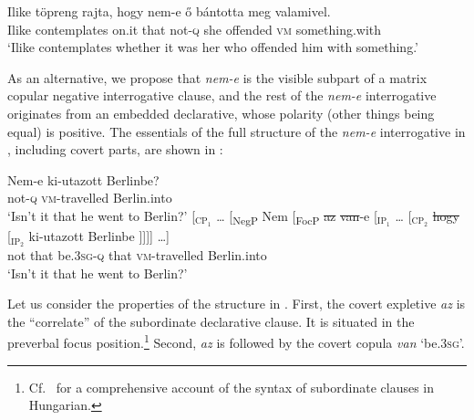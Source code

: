 \documentclass[output=paper,colorlinks,citecolor=brown]{langscibook}
\begin{document}
	\ea\label{ex:ilike}
	\gll Ilike töpreng rajta, hogy nem-e ő bántotta meg {valamivel.}\\
	Ilike contemplates on.it that not\textsc{-q} she offended \textsc{vm} something.with\\ 
	\glt`Ilike contemplates whether it was her who offended him with something.' \jambox*{[HNC]}
	\z
	
	As an alternative, we propose that \textit{nem-e} is the visible subpart of a matrix copular negative interrogative clause, and the rest of the \textit{nem-e} interrogative originates from an embedded  declarative, whose polarity (other things being equal) is positive. The  essentials of the full structure
	of the \textit{nem-e} interrogative in  , including covert parts,
	are shown in :
	
	\ea\label{ex:e}
	\gll Nem-e ki-utazott Berlinbe?\\
    not-\textsc{q} \textsc{vm}-travelled Berlin.into\\
    \glt `Isn't it that he went to Berlin?'
	\z
	\ea\label{ex:covert}
	\gll [$_{\text{CP}_1}$ \dots {} [\textsubscript{NegP} Nem [\textsubscript{FocP} \sout{az}  \sout{van}-e   [$_{\text{IP}_1}$ \dots { } \hspace{4cm} [$_{\text{CP}_2}$  \sout{hogy} [$_{\text{IP}_2}$ ki-utazott {Berlinbe ]]]] \dots ]}\\
	{} {} {} not {} that be.3\textsc{sg}-\textsc{q}  {} {} {} {} that {} \textsc{vm}-travelled Berlin.into\\
	\glt `Isn't it that he went to Berlin?'
	\z
	
	\noindent Let us consider the properties of the structure in . First, the  covert expletive \textit{az} is the ``correlate'' of the subordinate declarative clause. It is situated in the preverbal focus position.\footnote{Cf.~\citet{kenesei1994} for a comprehensive account of the syntax of subordinate clauses in Hungarian.} Second,  \textit{az} is followed by the covert copula \textit{van} `be.3\textsc{sg}'. 
	
\end{document}
